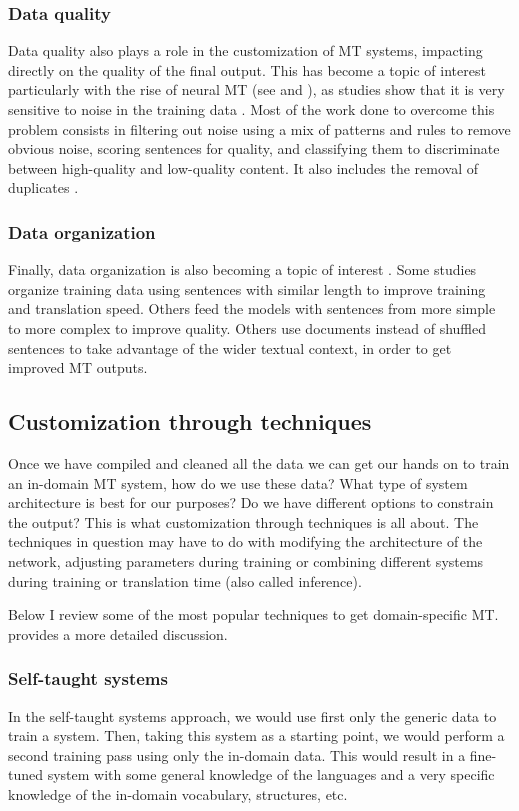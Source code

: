 \documentclass[output=paper]{langscibook}
\begin{document}
\subsubsection{Data quality}
Data quality also plays a role in the customization of MT systems, impacting directly on the quality of the final output. This has become a topic of interest particularly with the rise of neural MT (see  and ), as studies show that it is very sensitive to noise in the training data \citep{Khayrallah2018}. Most of the work done to overcome this problem consists in filtering out noise using a mix of patterns and rules to remove obvious noise, scoring sentences for quality, and classifying them to discriminate between high-quality and low-quality content. It also includes the removal of duplicates \citep{Khayrallah2018}.

\subsubsection{Data organization}
Finally, data organization is also becoming a topic of interest \citep{Mohiuddin2022}. Some studies organize training data using sentences with similar length to improve training and translation speed. Others feed the models with sentences from more simple to more complex to improve quality. Others use documents instead of shuffled sentences to take advantage of the wider textual context, in order to get improved MT outputs. 

\subsection{Customization through techniques}

Once we have compiled and cleaned all the data we can get our hands on to train an in-domain MT system, how do we use these data? What type of system architecture is best for our purposes? Do we have different options to constrain the output? This is what customization through techniques is all about. The techniques in question may have to do with modifying the architecture of the network, adjusting parameters during training or combining different systems during training or translation time (also called inference). 

Below I review some of the most popular techniques to get domain-specific MT. \citet[Ch. 13]{Koehn2020} provides a more detailed discussion.

\subsubsection{Self-taught systems}
In the self-taught systems approach, we would use first only the generic data to train a system. Then, taking  this system as a starting point, we would perform a second training pass using only the in-domain data. This would result in a fine-tuned system with some general knowledge of the languages and a very specific knowledge of the in-domain vocabulary, structures, etc. 
\end{document}
